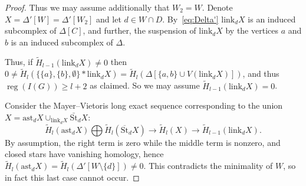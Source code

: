 \documentclass[ALCO,published]{cedram}
\numberwithin{equation}{section}
\newcommand \reg{\operatorname{reg}}
\newcommand \Vr{\operatorname{V}}
\begin{document}
\begin{proof}
Thus we may assume additionally that
$W_2=W$. 
Denote $X=\Delta'[W]=\Delta'[W_2]$ and let $d\in W\cap D$.
By~\eqref{eq:Delta'} $\text{link}_d X$ is an induced subcomplex of $\Delta[C]$, and further, the suspension of $\text{link}_d X$ by the vertices $a$ and $b$ is an induced
subcomplex of $\Delta$.

Thus, if
$\widetilde{H}_{l-1}(\text{link}_d X)\neq 0$
then
$0\neq \widetilde{H}_l (\{\{a\},\{b\},\emptyset\}*\text{link}_d X)=\widetilde{H}_l(\Delta[\{a,b\}\cup V(\text{link}_d X)])$, and thus $\reg(I(G))\ge l+2$ as claimed. 
So we may assume $\widetilde{H}_{l-1}(\text{link}_d X)=0$.


Consider the Mayer--Vietoris long exact sequence
corresponding to the union
$X=\text{ast}_d X\cup_{\text{link}_d X} \bar{\text{St}}_d X$:
$$\widetilde{H}_l (\text{ast}_{d} X) \bigoplus \widetilde{H}_l (\overline{\text{St}}_{d} X) \longrightarrow \widetilde{H}_l (X) \longrightarrow \widetilde{H}_{l-1} (\text{link}_d X).$$
By assumption, the right term is zero while the middle term is nonzero, and closed stars have vanishing homology, hence
$\widetilde{H}_l (\text{ast}_{d} X)=
\widetilde{H}_l (\Delta'[W\setminus\{d\}])\neq 0$.
This contradicts the minimality of $W$, so in fact this last case cannot occur.
\end{proof}

\end{document}
